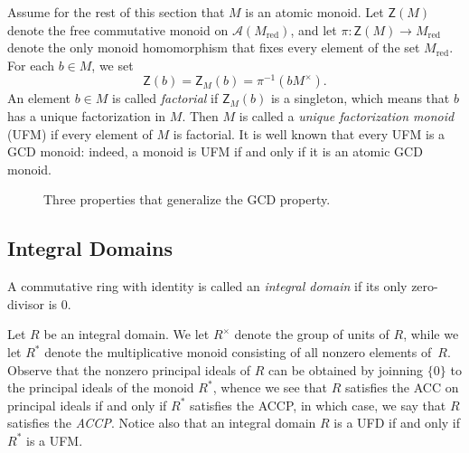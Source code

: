 \documentclass[10pt]{amsart}
\theoremstyle{definition}
\theoremstyle{remark}
\numberwithin{equation}{section}
\begin{document}
Assume for the rest of this section that $M$ is an atomic monoid. Let $\mathsf{Z}(M)$ denote the free commutative monoid on $\mathcal{A}(M_{\text{red}})$, and let $\pi \colon \mathsf{Z}(M) \to M_{\text{red}}$ denote the only monoid homomorphism that fixes every element of the set $M_{\text{red}}$. For each $b \in M$, we set
\[
  \mathsf{Z}(b) = \mathsf{Z}_M(b) = \pi^{-1} (bM^\times).
\]
An element $b \in M$ is called \emph{factorial} if $\mathsf{Z}_M(b)$ is a singleton, which means that $b$ has a unique factorization in $M$. Then $M$ is called a \emph{unique factorization monoid} (UFM) if every element of $M$ is factorial. It is well known that every UFM is a GCD monoid: indeed, a monoid is UFM if and only if it is an atomic GCD monoid.
\begin{figure}[ht]
  \caption{Three properties that generalize the GCD property.}
  \label{fig:generalized-gcd diagram}
\end{figure}



\medskip
\subsection{Integral Domains}

A commutative ring with identity is called an \emph{integral domain} if its only zero-divisor is $0$. 
\smallskip

Let $R$ be an integral domain. We let $R^\times$ denote the group of units of $R$, while we let $R^*$ denote the multiplicative monoid consisting of all nonzero elements of~$R$. Observe that the nonzero principal ideals of $R$ can be obtained by joinning $\{0\}$ to the principal ideals of the monoid $R^*$, whence we see that $R$ satisfies the ACC on principal ideals if and only if $R^*$ satisfies the ACCP, in which case, we say that $R$ satisfies the \emph{ACCP}. Notice also that an integral domain $R$ is a UFD if and only if $R^*$ is a UFM.
\smallskip
\end{document}
